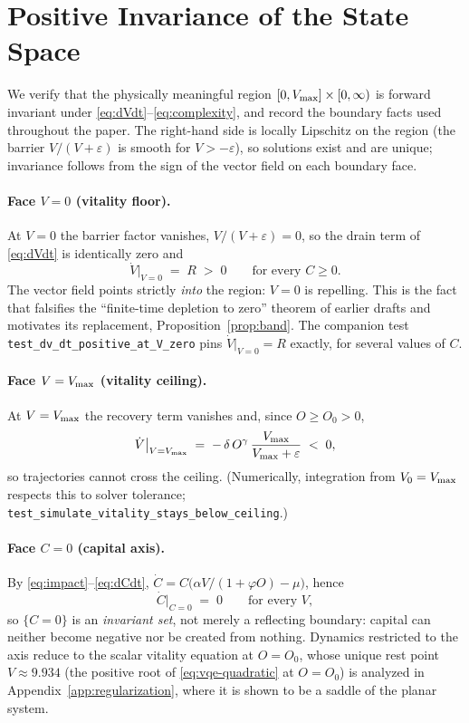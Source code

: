 \section{Positive Invariance of the State Space}
\label{app:invariance}

We verify that the physically meaningful region
$[0,V_{\max}]\times[0,\infty)$ is forward invariant under
\eqref{eq:dVdt}--\eqref{eq:complexity}, and record the boundary facts used
throughout the paper. The right-hand side is locally Lipschitz on the
region (the barrier $V/(V+\varepsilon)$ is smooth for $V>-\varepsilon$), so
solutions exist and are unique; invariance follows from the sign of the
vector field on each boundary face.

\paragraph{Face $V=0$ (vitality floor).}
At $V=0$ the barrier factor vanishes, $V/(V+\varepsilon)=0$, so the drain
term of \eqref{eq:dVdt} is identically zero and
\[
\dot V\big|_{V=0} \;=\; R \;>\; 0
\qquad\text{for every } C\ge0 .
\]
The vector field points strictly \emph{into} the region: $V=0$ is repelling.
This is the fact that falsifies the ``finite-time depletion to zero''
theorem of earlier drafts and motivates its replacement,
Proposition~\ref{prop:band}. The companion test
\texttt{test\_dv\_dt\_positive\_at\_V\_zero} pins
$\dot V|_{V=0}=R$ exactly, for several values of $C$.

\paragraph{Face $V=V_{\max}$ (vitality ceiling).}
At $V=V_{\max}$ the recovery term vanishes and, since $O\ge O_0>0$,
\[
\dot V\big|_{V=V_{\max}}
\;=\; -\,\delta\,O^{\gamma}\,\frac{V_{\max}}{V_{\max}+\varepsilon}
\;<\;0 ,
\]
so trajectories cannot cross the ceiling. (Numerically, integration from
$V_0=V_{\max}$ respects this to solver tolerance;
\texttt{test\_simulate\_vitality\_stays\_below\_ceiling}.)

\paragraph{Face $C=0$ (capital axis).}
By \eqref{eq:impact}--\eqref{eq:dCdt}, $\dot C = C\bigl(\alpha
V/(1+\varphi O)-\mu\bigr)$, hence
\[
\dot C\big|_{C=0} \;=\; 0
\qquad\text{for every } V ,
\]
so $\{C=0\}$ is an \emph{invariant set}, not merely a reflecting boundary:
capital can neither become negative nor be created from nothing. Dynamics
restricted to the axis reduce to the scalar vitality equation at
$O=O_0$, whose unique rest point $V\approx9.934$ (the positive root of
\eqref{eq:vqe-quadratic} at $O=O_0$) is analyzed in
Appendix~\ref{app:regularization}, where it is shown to be a saddle of the
planar system.

